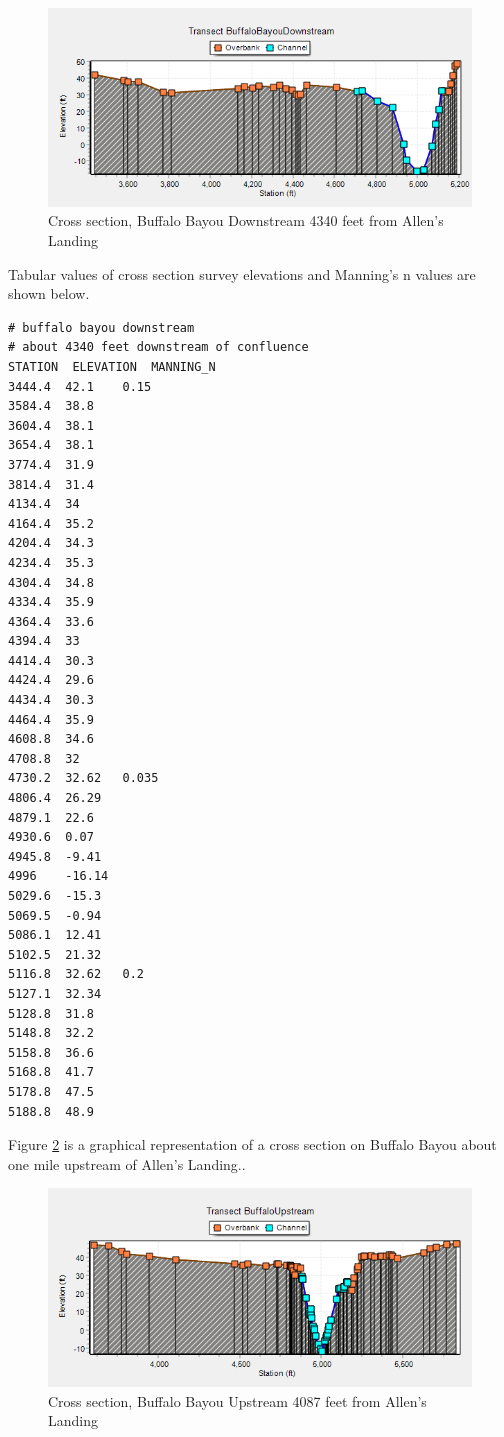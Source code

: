 \documentclass[12pt]{article}
\begin{document}
\begin{figure}[h!] %
   \centering
   \includegraphics[width=5.5in]{BuffaloDownstream.png} 
   \caption{Cross section, Buffalo Bayou Downstream 4340 feet from Allen's Landing}
   \label{fig:BuffaloDownstream}
\end{figure}
Tabular values of cross section survey elevations and Manning's n values are shown below.
\begin{verbatim}
# buffalo bayou downstream
# about 4340 feet downstream of confluence
STATION  ELEVATION  MANNING_N
3444.4	42.1	0.15
3584.4	38.8	
3604.4	38.1	
3654.4	38.1	
3774.4	31.9	
3814.4	31.4	
4134.4	34	
4164.4	35.2	
4204.4	34.3	
4234.4	35.3	
4304.4	34.8	
4334.4	35.9	
4364.4	33.6	
4394.4	33	
4414.4	30.3	
4424.4	29.6	
4434.4	30.3	
4464.4	35.9	
4608.8	34.6	
4708.8	32	
4730.2	32.62	0.035
4806.4	26.29	
4879.1	22.6	
4930.6	0.07	
4945.8	-9.41	
4996	-16.14	
5029.6	-15.3	
5069.5	-0.94	
5086.1	12.41	
5102.5	21.32	
5116.8	32.62	0.2
5127.1	32.34	
5128.8	31.8	
5148.8	32.2	
5158.8	36.6	
5168.8	41.7	
5178.8	47.5	
5188.8	48.9	
\end{verbatim}


Figure  \ref{fig:BuffaloUpstream} is a graphical representation of a cross section on Buffalo Bayou about one mile upstream of Allen's Landing..
\begin{figure}[h!] %
   \centering
   \includegraphics[width=5.5in]{BuffaloUpstream.png} 
   \caption{Cross section, Buffalo Bayou Upstream 4087 feet from Allen's Landing}
   \label{fig:BuffaloUpstream}
\end{figure}
\end{document}
